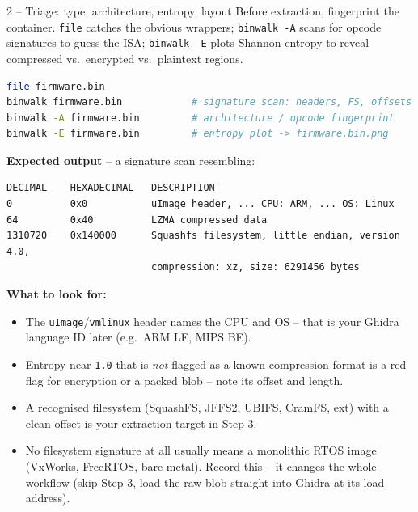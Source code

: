 \documentclass[11pt,a4paper]{article}
\begin{document}
\begin{stepbox}{2 -- Triage: type, architecture, entropy, layout}
Before extraction, fingerprint the container. \texttt{file} catches
the obvious wrappers; \texttt{binwalk -A} scans for opcode signatures
to guess the ISA; \texttt{binwalk -E} plots Shannon entropy to reveal
compressed vs.\ encrypted vs.\ plaintext regions.

\begin{lstlisting}[language=bash]
file firmware.bin
binwalk firmware.bin            # signature scan: headers, FS, offsets
binwalk -A firmware.bin         # architecture / opcode fingerprint
binwalk -E firmware.bin         # entropy plot -> firmware.bin.png
\end{lstlisting}

\textbf{Expected output} -- a signature scan resembling:

\begin{lstlisting}
DECIMAL    HEXADECIMAL   DESCRIPTION
0          0x0           uImage header, ... CPU: ARM, ... OS: Linux
64         0x40          LZMA compressed data
1310720    0x140000      Squashfs filesystem, little endian, version 4.0,
                         compression: xz, size: 6291456 bytes
\end{lstlisting}

\textbf{What to look for:}
\begin{itemize}\setlength{\itemsep}{1pt}
  \item The \texttt{uImage}/\texttt{vmlinux} header names the CPU and
        OS -- that is your Ghidra language ID later (e.g.\ ARM LE,
        MIPS BE).
  \item Entropy near \texttt{1.0} that is \emph{not} flagged as a known
        compression format is a red flag for encryption or a packed
        blob -- note its offset and length.
  \item A recognised filesystem (SquashFS, JFFS2, UBIFS, CramFS, ext)
        with a clean offset is your extraction target in Step 3.
  \item No filesystem signature at all usually means a monolithic
        RTOS image (VxWorks, FreeRTOS, bare-metal). Record this -- it
        changes the whole workflow (skip Step 3, load the raw blob
        straight into Ghidra at its load address).
\end{itemize}
\end{stepbox}
\end{document}
